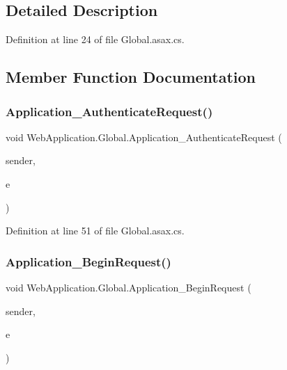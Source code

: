 \subsection{Detailed Description}


Definition at line 24 of file Global.\+asax.\+cs.



\subsection{Member Function Documentation}
\mbox{\label{classWebApplication_1_1Global_ab7065c8aecde7ca74325357b33723444}} 
\subsubsection{\texorpdfstring{Application\_AuthenticateRequest()}{Application\_AuthenticateRequest()}}
{\footnotesize\ttfamily void Web\+Application.\+Global.\+Application\+\_\+\+Authenticate\+Request (\begin{DoxyParamCaption}\item[{object}]{sender,  }\item[{Event\+Args}]{e }\end{DoxyParamCaption})\hspace{0.3cm}{\ttfamily [protected]}}



Definition at line 51 of file Global.\+asax.\+cs.

\mbox{\label{classWebApplication_1_1Global_a6beaa413614692ccc4ab10e88e8e79dc}} 
\subsubsection{\texorpdfstring{Application\_BeginRequest()}{Application\_BeginRequest()}}
{\footnotesize\ttfamily void Web\+Application.\+Global.\+Application\+\_\+\+Begin\+Request (\begin{DoxyParamCaption}\item[{object}]{sender,  }\item[{Event\+Args}]{e }\end{DoxyParamCaption})\hspace{0.3cm}{\ttfamily [protected]}}



